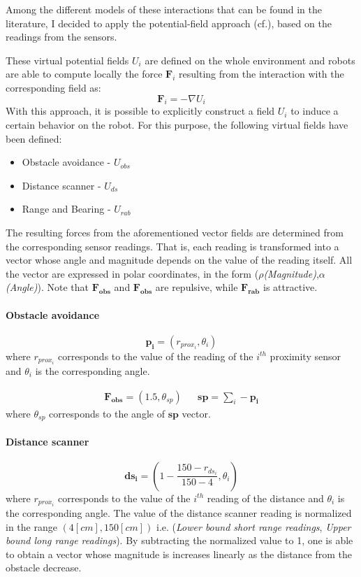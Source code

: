 Among the different models of these interactions that can be found in the literature, I decided to apply the potential-field approach (cf.\cite{howard2002mobile}), based on the readings from the sensors.

These virtual potential fields $U_i$ are defined on the whole environment and robots are able to compute locally the force $\mathbf{F}_i$ resulting from the interaction with the corresponding field as:
\begin{equation}
  \mathbf{F}_i = -\nabla U_i
\end{equation}
With this approach, it is possible to explicitly construct a field $U_i$ to induce a certain behavior on the robot.
For this purpose, the following virtual fields have been defined:
\begin{itemize}
  \item Obstacle avoidance - $U_{obs}$
  \item Distance scanner - $U_{ds}$
  \item Range and Bearing - $U_{rab}$
\end{itemize} 

The resulting forces from the aforementioned vector fields are determined from the corresponding sensor readings.
That is, each reading is transformed into a vector whose angle and magnitude depends on the value of the reading itself.
All the vector are expressed in polar coordinates, in the form ($\rho$\emph{(Magnitude)},$\alpha$\emph{(Angle)}).
Note that $\mathbf{F_{obs}}$ and $\mathbf{F_{obs}}$ are repulsive, while $\mathbf{F_{rab}}$ 
is attractive.

\paragraph{Obstacle avoidance}
\begin{equation}
\mathbf{p_i} = (r_{prox_{i}},\theta_i)  
\end{equation}
where $r_{prox_i}$ corresponds to the value of the reading of the $i^{th}$ proximity sensor and $\theta_i$ is the corresponding angle.

\begin{align}
 \mathbf{F_{obs}} = (1.5,\theta_{sp}) & & \mathbf{sp} = \sum_i -\mathbf{p_i}  
\end{align}
where $\theta_{sp}$ corresponds to the angle of $\mathbf{sp}$ vector.

\paragraph{Distance scanner}
\begin{equation}
\mathbf{ds_i} = (1 - \frac{150 - r_{ds_{i}}}{150-4},\theta_i)  
\end{equation}
where $r_{prox_i}$ corresponds to the value of the $i^{th}$ reading of the distance and $\theta_i$ is the corresponding angle.
The value of the distance scanner reading is normalized in the range $(4[cm],150[cm])$ 
i.e. (\emph{Lower bound short range readings}, \emph{Upper bound long range readings}).
By subtracting the normalized value to 1, one is able to obtain a vector whose 
magnitude is increases linearly as the distance from the obstacle decrease.

